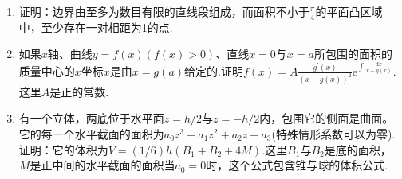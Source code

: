 \begin{enumerate}
	\item 证明：边界由至多为数目有限的直线段组成，而面积不小于$\frac{\pi}{4}$的平面凸区域中，至少存在一对相距为1的点.
	
	\item 如果$x$轴、曲线$y=f(x)(f(x)>0)$、直线$x=0$与$x=a$所包围的面积的质量中心的$x$坐标$\tilde{x}$是由$\tilde{x}=g(a)$给定的.证明$f(x)=A \frac{g^{\prime}(x)}{(x-g(x))^{2}} \mathrm{e}^{\int \frac{\mathrm{d} x}{x-g(x)}}$.这里$A$是正的常数.
	\item 有一个立体，两底位于水平面$z=h/2$与$z=-h/2$内，包围它的侧面是曲面。它的每一个水平截面的面积为$a_{0} z^{3}+a_{1} z^{2}+a_{2} z+a_{3}$(特殊情形系数可以为零).证明：它的体积为$V=(1 / 6) h\left(B_{1}+B_{2}+4 M\right)$.这里$B_{1}$与$B_{2}$是底的面积，$M$是正中间的水平截面的面积当$a_{0}=0$时，这个公式包含锥与球的体积公式.
\end{enumerate} 